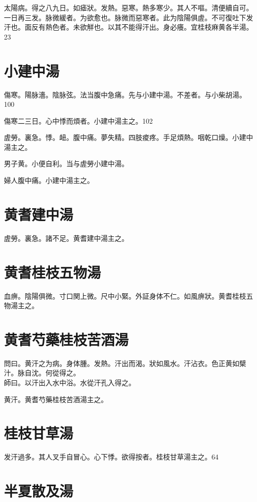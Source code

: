 \documentclass[12pt,twoside,UTF8,b5paper]{ctexbook}
\begin{document}
太陽病。得之八九日。如瘧狀。发熱。惡寒。熱多寒少。其人不嘔。清便續自可。一日再三发。脉微緩者。为欲愈也。脉微而惡寒者。此为陰陽俱虗。不可復{吐下}发汗也。面反有熱色者。未欲觧也。以其不能得汗出。身必癢。宜桂枝麻黄各半湯。23

\section{小建中湯}

傷寒。陽脉濇。陰脉弦。法当腹中急痛。先与小建中湯。不差者。与小柴胡湯。100

傷寒二三日。心中悸而煩者。小建中湯主之。102

虗勞。裏急。悸。衄。腹中痛。夢失精。四肢痠疼。手足煩熱。咽乾口燥。小建中湯主之。

男子黄。小便自利。当与虗勞小建中湯。

婦人腹中痛。小建中湯主之。

\section{黄耆建中湯}

虗勞。裏急。諸不足。黄耆建中湯主之。

\section{黄耆桂枝五物湯}

血痹。陰陽俱微。寸口関上微。尺中小緊。外証身体不仁。如風痹狀。黄耆桂枝五物湯主之。

\section{黄耆芍藥桂枝苦酒湯}

問曰。黄汗之为病。身体腫。发熱。汗出而渴。狀如風水。汗沾衣。色正黄如檗汁。脉自沈。何從得之。\\
師曰。以汗出入水中浴。水從汗孔入得之。

黄汗。黄耆芍藥桂枝苦酒湯主之。

\section{桂枝甘草湯}

发汗過多。其人叉手自冒心。心下悸。欲得按者。桂枝甘草湯主之。64

\section{半夏散及湯}
\end{document}
